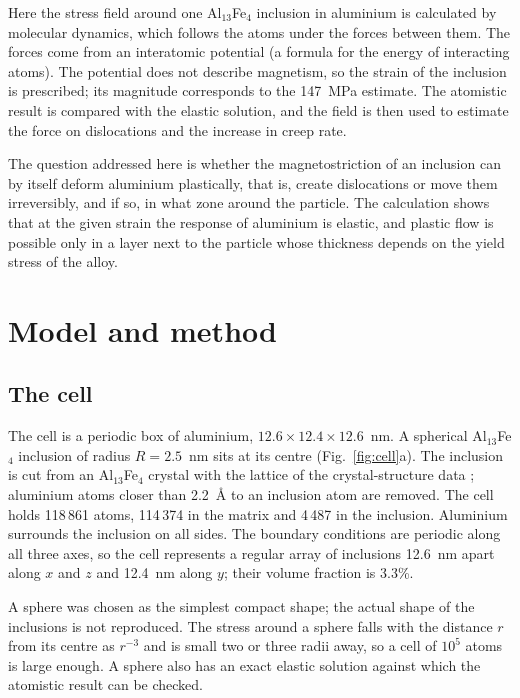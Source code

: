 \documentclass[11pt,a4paper]{article}
\begin{document}
Here the stress field around one Al$_{13}$Fe$_4$ inclusion in aluminium is
calculated by molecular dynamics, which follows the atoms under the forces
between them. The forces come from an interatomic potential (a formula for
the energy of interacting atoms). The potential does not describe magnetism,
so the strain of the inclusion is prescribed; its magnitude corresponds to
the 147~MPa estimate. The atomistic result is compared with the elastic
solution, and the field is then used to estimate the force on dislocations
and the increase in creep rate.

The question addressed here is whether the magnetostriction of an
inclusion can by itself deform aluminium plastically, that is, create
dislocations or move them irreversibly, and if so, in what zone around the
particle. The calculation shows that at the given strain the response of
aluminium is elastic, and plastic flow is possible only in a layer next to
the particle whose thickness depends on the yield stress of the alloy.

\section{Model and method}

\subsection{The cell}

The cell is a periodic box of aluminium, $12.6\times12.4\times12.6$~nm.
A spherical Al$_{13}$Fe$_4$ inclusion of radius $R=2.5$~nm sits at its centre
(Fig.~\ref{fig:cell}a). The inclusion is cut from an Al$_{13}$Fe$_4$ crystal
with the lattice of the crystal-structure data \cite{Liu2024CIF}; aluminium
atoms closer than 2.2~\AA{} to an inclusion atom are removed. The cell holds
118\,861 atoms, 114\,374 in the matrix and 4\,487 in the inclusion. Aluminium surrounds the inclusion on all sides. The boundary
conditions are periodic along all three axes, so the cell represents a
regular array of inclusions 12.6~nm apart along $x$ and $z$ and 12.4~nm along $y$; their volume fraction is 3.3\%.

A sphere was chosen as the simplest compact shape; the actual shape of the
inclusions is not reproduced. The stress
around a sphere falls with the distance $r$ from its centre as
$r^{-3}$ and is small two or three radii away, so a cell of $10^5$ atoms is
large enough. A sphere also has an exact elastic solution
\cite{Eshelby1957,Mura1987} against which the atomistic result can be checked.
\end{document}
